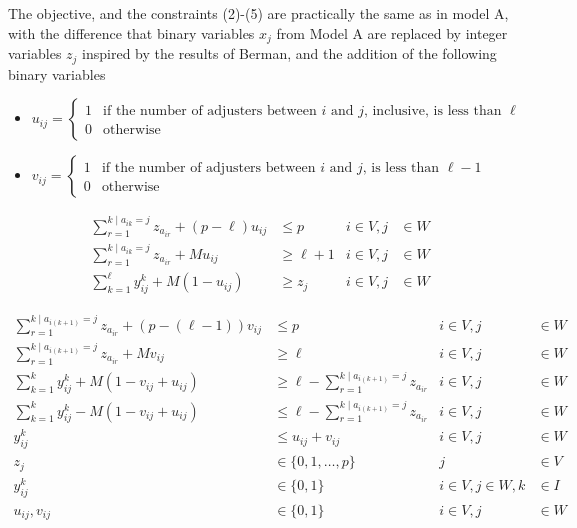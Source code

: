 \begin{frame}[allowframebreaks]
  The objective, and the constraints (2)-(5) 
  are practically the same as in model A,
  with the difference that binary variables $x_j$ from Model A
  are replaced by integer variables $z_j$ inspired by the results of Berman,
  and the addition of the following binary variables
  {\scriptsize
    \begin{itemize}
    \item $u_{ij} = \begin{cases} 1 & \mbox{if the number of adjusters between } i \mbox{ and } j \mbox{, inclusive, is less than } \ell \\
      0 & \mbox{otherwise}
    \end{cases}$
    \item $v_{ij} = \begin{cases} 1 & \mbox{if the number of adjusters between } i \mbox{ and } j \mbox{, is less than } \ell - 1 \\
      0 & \mbox{otherwise}
    \end{cases}$
    \end{itemize}
  }

{\footnotesize
  \begin{align}
    \sum_{r = 1}^{k \mid a_{ik}=j}{z_{a_{ir}}} + (p-\ell) u_{ij} & \leq p &  i \in V, j &\in W \\
    \sum_{r = 1}^{k \mid a_{ik}=j}{z_{a_{ir}}} + M u_{ij} & \geq \ell+1   &  i \in V, j &\in W \\
    \sum_{k = 1}^{\ell}{y_{ij}^{k}} + M (1 - u_{ij}) & \geq z_j           &  i \in V, j &\in W
  \end{align}
  
  \begin{align}
    \sum_{r = 1}^{k \mid a_{i(k+1)}=j}{z_{a_{ir}}} + (p-(\ell-1)) v_{ij} & \leq p                                     &  i \in V, j &\in W\\
    \sum_{r = 1}^{k \mid a_{i(k+1)}=j}{z_{a_{ir}}} + M v_{ij}         & \geq \ell                                     &  i \in V, j &\in W\\
    \sum_{k=1}^{k}{y_{ij}^{k}} + M (1 - v_{ij} + u_{ij}) & \geq \ell - \sum_{r = 1}^{k \mid a_{i(k+1)}=j}{z_{a_{ir}}} &  i \in V, j &\in W\\
    \sum_{k=1}^{k}{y_{ij}^{k}} - M (1 - v_{ij} + u_{ij}) & \leq \ell - \sum_{r = 1}^{k \mid a_{i(k+1)}=j}{z_{a_{ir}}} &  i \in V, j &\in W\\
    y_{ij}^{k} & \leq u_{ij} + v_{ij}  &        i \in V,j &\in W \\
    z_j & \in \{0,1,\ldots,p\}         &                j &\in V \nonumber\\
    y_{ij}^{k} & \in \{0,1\}           &  i\in V,j\in W,k &\in I \nonumber\\
    u_{ij},v_{ij} & \in \{0,1\}        &        i \in V,j &\in W \nonumber
  \end{align}
}
\end{frame}
